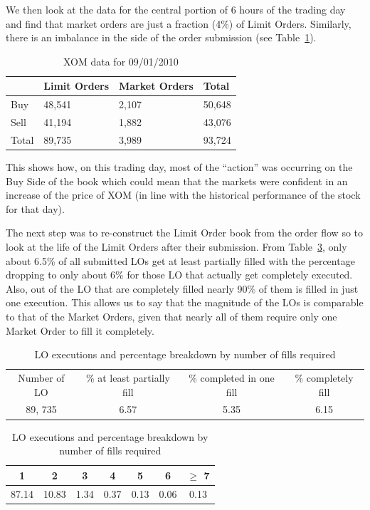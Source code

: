 We then look at the data for the central portion of 6 hours of the trading day and find that market orders are just a fraction (4\%) of Limit Orders. Similarly, there is an imbalance in the side of the order submission (see Table~\ref{tab:xom}). 
	\begin{table}[htbp]
	\centering
	\caption{XOM data for 09/01/2010 \label{tab:xom}}
	\begin{tabular}{llll} 
	& Limit Orders & Market Orders & Total \\ \hline
	Buy & 48,541 & 2,107 & 50,648 \\ 
	Sell & 41,194 & 1,882 & 43,076 \\
	Total & 89,735 & 3,989 & 93,724
	\end{tabular}
	\end{table}
This shows how, on this trading day, most of the ``action'' was occurring on the Buy Side of the book which could mean that the markets were confident in an increase of the price of XOM (in line with the historical performance of the stock for that day).


The next step was to re-construct the Limit Order book from the order flow so to look at the life of the Limit Orders after their submission. From Table~\ref{tab:LOexec}, only about 6.5\% of all submitted LOs get at least partially filled with the percentage dropping to only about 6\% for those LO that actually get completely executed. Also, out of the LO that are completely filled nearly 90\% of them is filled in just one execution. This allows us to say that the magnitude of the LOs is comparable to that of the Market Orders, given that nearly all of them require only one Market Order to fill it completely. 
	\begin{table}[htbp]
	\centering
	\caption{LO executions and percentage breakdown by number of fills required \label{tab:LOexec}}
	\begin{tabular}{cccc}
	Number of LO & \% at least partially fill & \% completed in one fill & \% completely fill \\
	89, 735 & 6.57 & 5.35 & 6.15
	\end{tabular}
	\begin{tabular}{ccccccc}
	1 & 2 & 3 & 4 & 5 & 6 & $\geq$ 7 \\ \hline
	87.14 & 10.83 & 1.34 & 0.37 & 0.13 & 0.06 & 0.13
	\end{tabular}
	\end{table}


